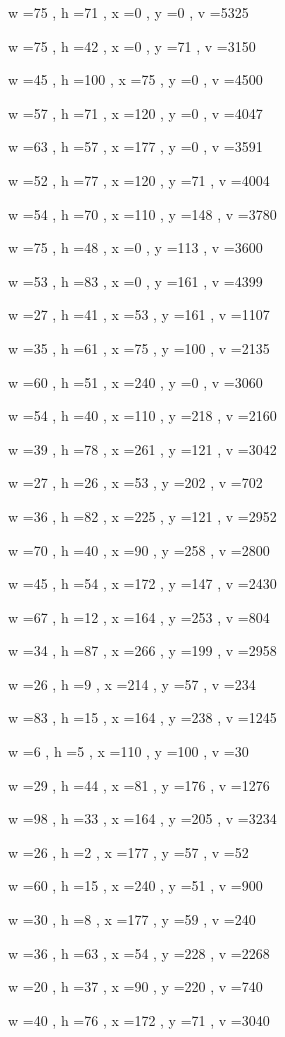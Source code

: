\documentclass[11pt]{article}
\begin{document}
w =75 , h =71 , x =0 , y =0 , v =5325
\par
w =75 , h =42 , x =0 , y =71 , v =3150
\par
w =45 , h =100 , x =75 , y =0 , v =4500
\par
w =57 , h =71 , x =120 , y =0 , v =4047
\par
w =63 , h =57 , x =177 , y =0 , v =3591
\par
w =52 , h =77 , x =120 , y =71 , v =4004
\par
w =54 , h =70 , x =110 , y =148 , v =3780
\par
w =75 , h =48 , x =0 , y =113 , v =3600
\par
w =53 , h =83 , x =0 , y =161 , v =4399
\par
w =27 , h =41 , x =53 , y =161 , v =1107
\par
w =35 , h =61 , x =75 , y =100 , v =2135
\par
w =60 , h =51 , x =240 , y =0 , v =3060
\par
w =54 , h =40 , x =110 , y =218 , v =2160
\par
w =39 , h =78 , x =261 , y =121 , v =3042
\par
w =27 , h =26 , x =53 , y =202 , v =702
\par
w =36 , h =82 , x =225 , y =121 , v =2952
\par
w =70 , h =40 , x =90 , y =258 , v =2800
\par
w =45 , h =54 , x =172 , y =147 , v =2430
\par
w =67 , h =12 , x =164 , y =253 , v =804
\par
w =34 , h =87 , x =266 , y =199 , v =2958
\par
w =26 , h =9 , x =214 , y =57 , v =234
\par
w =83 , h =15 , x =164 , y =238 , v =1245
\par
w =6 , h =5 , x =110 , y =100 , v =30
\par
w =29 , h =44 , x =81 , y =176 , v =1276
\par
w =98 , h =33 , x =164 , y =205 , v =3234
\par
w =26 , h =2 , x =177 , y =57 , v =52
\par
w =60 , h =15 , x =240 , y =51 , v =900
\par
w =30 , h =8 , x =177 , y =59 , v =240
\par
w =36 , h =63 , x =54 , y =228 , v =2268
\par
w =20 , h =37 , x =90 , y =220 , v =740
\par
w =40 , h =76 , x =172 , y =71 , v =3040
\end{document}
